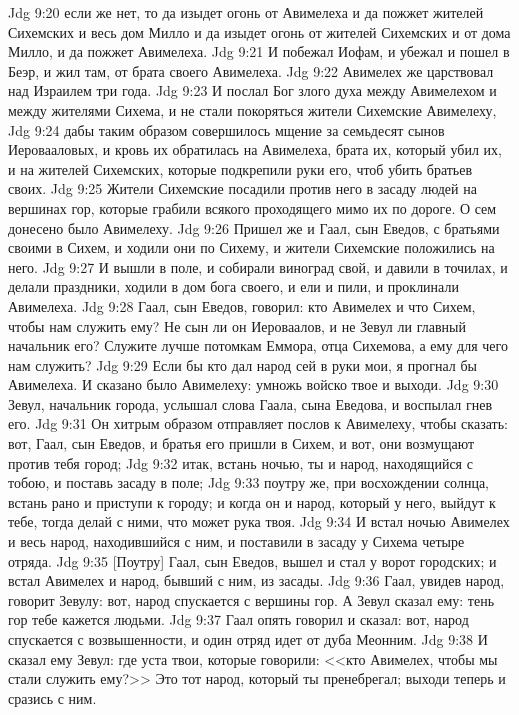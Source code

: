 \vs Jdg 9:20 если же нет, то да изыдет огонь от Авимелеха и да пожжет жителей Сихемских и весь дом Милло и да изыдет огонь от жителей Сихемских и от дома Милло, и да пожжет Авимелеха.
\vs Jdg 9:21 И побежал Иофам, и убежал и пошел в Беэр, и жил там,  от брата своего Авимелеха.
\rsbpar\vs Jdg 9:22 Авимелех же царствовал над Израилем три года.
\vs Jdg 9:23 И послал Бог злого духа между Авимелехом и между жителями Сихема, и не стали покоряться жители Сихемские Авимелеху,
\vs Jdg 9:24 дабы таким образом совершилось мщение за семьдесят сынов Иеровааловых, и кровь их обратилась на Авимелеха, брата их, который убил их, и на жителей Сихемских, которые подкрепили руки его, чтоб убить братьев своих.
\vs Jdg 9:25 Жители Сихемские посадили против него в засаду людей на вершинах гор, которые грабили всякого проходящего мимо их по дороге. О сем донесено было Авимелеху.
\vs Jdg 9:26 Пришел же и Гаал, сын Еведов, с братьями своими в Сихем, и ходили они по Сихему, и жители Сихемские положились на него.
\vs Jdg 9:27 И вышли в поле, и собирали виноград свой, и давили в точилах, и делали праздники, ходили в дом бога своего, и ели и пили, и проклинали Авимелеха.
\vs Jdg 9:28 Гаал, сын Еведов, говорил: кто Авимелех и что Сихем, чтобы нам служить ему? Не сын ли он Иероваалов, и не Зевул ли главный начальник его? Служите лучше потомкам Еммора, отца Сихемова, а ему для чего нам служить?
\vs Jdg 9:29 Если бы кто дал народ сей в руки мои, я прогнал бы Авимелеха. И сказано было Авимелеху: умножь войско твое и выходи.
\vs Jdg 9:30 Зевул, начальник города, услышал слова Гаала, сына Еведова, и воспылал гнев его.
\vs Jdg 9:31 Он хитрым образом отправляет послов к Авимелеху, чтобы сказать: вот, Гаал, сын Еведов, и братья его пришли в Сихем, и вот, они возмущают против тебя город;
\vs Jdg 9:32 итак, встань ночью, ты и народ, находящийся с тобою, и поставь засаду в поле;
\vs Jdg 9:33 поутру же, при восхождении солнца, встань рано и приступи к городу; и когда он и народ, который у него, выйдут к тебе, тогда делай с ними, что может рука твоя.
\vs Jdg 9:34 И встал ночью Авимелех и весь народ, находившийся с ним, и поставили в засаду у Сихема четыре отряда.
\vs Jdg 9:35 [Поутру] Гаал, сын Еведов, вышел и стал у ворот городских; и встал Авимелех и народ, бывший с ним, из засады.
\vs Jdg 9:36 Гаал, увидев народ, говорит Зевулу: вот, народ спускается с вершины гор. А Зевул сказал ему: тень гор тебе кажется людьми.
\vs Jdg 9:37 Гаал опять говорил и сказал: вот, народ спускается с возвышенности, и один отряд идет от дуба Меонним.
\vs Jdg 9:38 И сказал ему Зевул: где уста твои, которые говорили: <<кто Авимелех, чтобы мы стали служить ему?>> Это тот народ, который ты пренебрегал; выходи теперь и сразись с ним.
